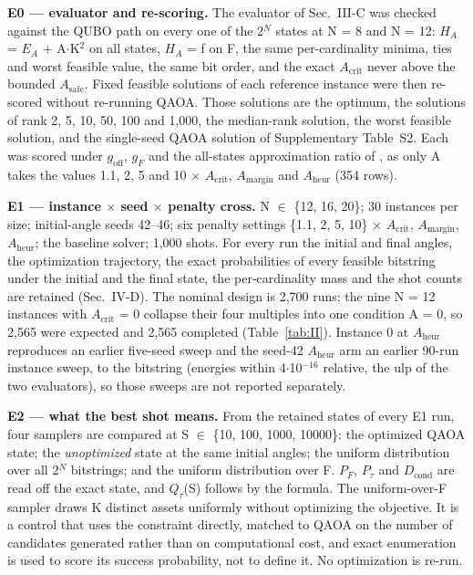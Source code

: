 \documentclass{ieeeaccess}
\begin{document}
\textbf{E0 --- evaluator and re-scoring.} The evaluator of Sec.~III-C was checked against the QUBO path on every one of the 2$^{N}$ states at N = 8 and N = 12: $H_{A}$ = $E_{A}$ + A$\cdot$K$^{2}$ on all states, $H_{A}$ = f on F, the same per-cardinality minima, ties and worst feasible value, the same bit order, and the exact $A_{\mathrm{crit}}$ never above the bounded $A_{\mathrm{safe}}$. Fixed feasible solutions of each reference instance were then re-scored without re-running QAOA. Those solutions are the optimum, the solutions of rank 2, 5, 10, 50, 100 and 1,000, the median-rank solution, the worst feasible solution, and the single-seed QAOA solution of Supplementary Table~S2. Each was scored under $g_{\mathrm{off}}$, $g_{F}$ and the all-states approximation ratio of \cite{ref22}, as only A takes the values 1.1, 2, 5 and 10 $\times$ $A_{\mathrm{crit}}$, $A_{\mathrm{margin}}$ and $A_{\mathrm{heur}}$ (354 rows).


\textbf{E1 --- instance $\times$ seed $\times$ penalty cross.} N $\in$ \{12, 16, 20\}; 30 instances per size; initial-angle seeds 42--46; six penalty settings \{1.1, 2, 5, 10\} $\times$ $A_{\mathrm{crit}}$, $A_{\mathrm{margin}}$, $A_{\mathrm{heur}}$; the baseline solver; 1,000 shots. For every run the initial and final angles, the optimization trajectory, the exact probabilities of every feasible bitstring under the initial and the final state, the per-cardinality mass and the shot counts are retained (Sec.~IV-D). The nominal design is 2,700 runs; the nine N = 12 instances with $A_{\mathrm{crit}}$ = 0 collapse their four multiples into one condition A = 0, so 2,565 were expected and 2,565 completed (Table~\ref{tab:II}). Instance 0 at $A_{\mathrm{heur}}$ reproduces an earlier five-seed sweep and the seed-42 $A_{\mathrm{heur}}$ arm an earlier 90-run instance sweep, to the bitstring (energies within 4$\cdot$10$^{-16}$ relative, the ulp of the two evaluators), so those sweeps are not reported separately.


\textbf{E2 --- what the best shot means.} From the retained states of every E1 run, four samplers are compared at S $\in$ \{10, 100, 1000, 10000\}: the optimized QAOA state; the \textit{unoptimized} state at the same initial angles; the uniform distribution over all 2$^{N}$ bitstrings; and the uniform distribution over F. $P_{F}$, $P_{\tau}$ and $D_{\mathrm{cond}}$ are read off the exact state, and $Q_{\tau}$(S) follows by the formula. The uniform-over-F sampler draws K distinct assets uniformly without optimizing the objective. It is a control that uses the constraint directly, matched to QAOA on the number of candidates generated rather than on computational cost, and exact enumeration is used to score its success probability, not to define it. No optimization is re-run.
\end{document}
